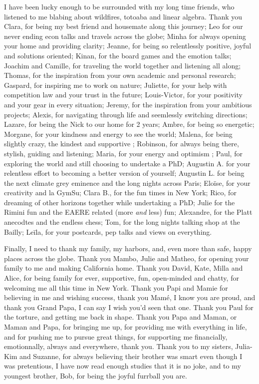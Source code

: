I have been lucky enough to be surrounded with my long time friends, who listened to me blabing about wildfires, totoaba and linear algebra. Thank you Clara, for being my best friend and housemate along this journey; Leo for our never ending econ talks and travels across the globe; Minha for always opening your home and providing clarity;  Jeanne, for being so relentlessly positive, joyful and solutions oriented; Kinan, for the board games and the emotion talks; Joachim and Camille, for traveling the world together and listening all along; Thomas, for the inspiration from your own academic and personal research; Gaspard, for inspiring me to work on nature;
Juliette, for your help with competition law and your trust in the future; Louis-Victor, for your positivity and your gear in every situation; Jeremy, for the inspiration from your ambitious projects; Alexis, for navigating through life and seemlessly switching directions; Lazare, for being the Nick to our home for 2 years; Ambre, for being so energetic;  Morgane, for your kindness and energy to see the world; Malena, for being slightly crazy, the kindest and supportive ; Robinson, for always being there, stylish, guiding and listening; Maria, for your energy and optimism ; Paul, for exploring the world and still choosing to undertake a PhD;  Augustin A. for your relentless effort to becoming a better version of yourself; Augustin L. for being the next climate grey eminence and the long nights across Paris; Elo\"ise, for your creativity and la GymSu; Clara B., for the fun times in New York; Rico, for dreaming of other horizons together while undertaking a PhD; Julie for the Rimini fun and the EAERE related (more \textit{and} less) fun; Alexandre, for the Platt anecodtes and the endless chess; Tom, for the long nights talking shop at the Bailly; Le\"ila, for your postcards, pep talks and views on everything.

Finally, I need to thank my family, my harbors, and, even more than safe, happy places across the globe. Thank you Mambo, Julie and Matheo, for opening your family to me and making California home. Thank you David, Kate, Milla and Alice, for being family for ever, supportive, fun, open-minded and chatty, for welcoming me all this time in New York. Thank you Papi and Mamie for believing in me and wishing success, thank you Mamé, I know you are proud, and thank you Grand Papa, I can say I wish you'd seen that one. Thank you Paul for the torture, and getting me back in shape. Thank you Papa and Maman, or Maman and Papa, for bringing me up, for providing me with everything in life, and for pushing me to pursue great things, for supporting me financially, emotionnally, always and everywhere, thank you. Thank you to my sisters, Julia-Kim and Suzanne, for always believing their brother was smart even though I was pretentious, I have now read enough studies that it is no joke, and to my youngest brother, Bob, for being the joyful furrball you are. 

